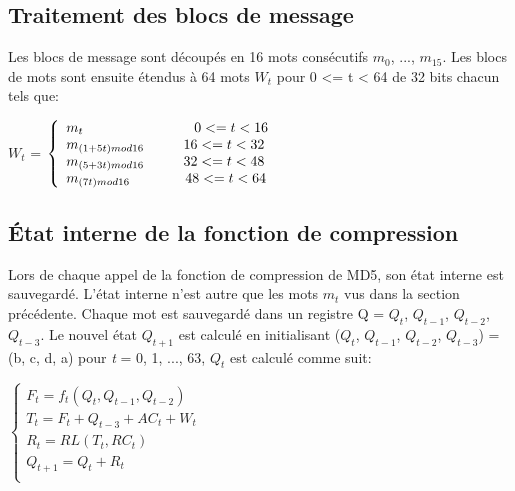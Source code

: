 \subsection{Traitement des blocs de message}
Les blocs de message sont découpés en 16 mots consécutifs $m_{0}$, ..., $m_{15}$. Les blocs de mots sont ensuite étendus à 64 mots $W_{t}$ pour 0 <= t < 64 de 32 bits chacun tels que:
\vspace{.5cm}

$W_{t}$ =
$\left\{
\begin{array}{l}
  m_{t} \hspace{2.8cm} 0 <= t < 16\\
  m_{(1 + 5t) mod 16} \hspace{1cm} 16 <= t < 32\\
  m_{(5 + 3t) mod 16} \hspace{1cm} 32 <= t < 48\\
  m_{(7t) mod 16} \hspace{1.4cm} 48 <= t < 64\\
\end{array}
\right.$
\vspace{.5cm}

\subsection{État interne de la fonction de compression}
Lors de chaque appel de la fonction de compression de MD5, son état interne est sauvegardé. L'état interne n'est autre que les mots $m_{t}$ vus dans la section précédente. Chaque mot est sauvegardé dans un registre Q = {$Q_{t}$, $Q_{t-1}$, $Q_{t-2}$, $Q_{t-3}$}. Le nouvel état $Q_{t+1}$ est calculé en initialisant ($Q_{t}$, $Q_{t-1}$, $Q_{t-2}$, $Q_{t-3}$) = (b, c, d, a) pour {\it{t}} = 0, 1, ..., 63, $Q_{t}$ est calculé comme suit:
\vspace{.5cm}

$\left\{
\begin{array}{l}
  F_t = f_t(Q_t, Q_{t-1}, Q_{t-2}) \\
  T_t = F_t + Q_{t-3} + AC_t + W_t \\
  R_t = RL(T_t, RC_t) \\
  Q_{t+1} = Q_t + R_t \\
\end{array}
\right.$
\vspace{.5cm}

